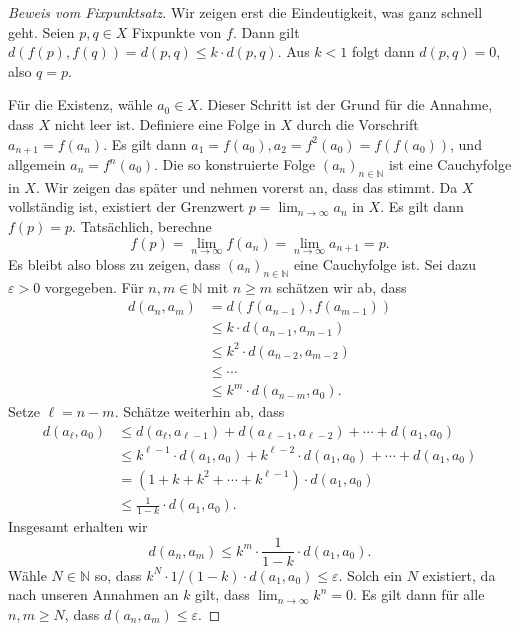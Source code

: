 \documentclass[../main.tex]{subfiles}
\begin{document}
\begin{proof}[Beweis vom Fixpunktsatz]
  Wir zeigen erst die Eindeutigkeit,
  was ganz schnell geht.
  Seien $p, q \in X$ Fixpunkte von $f$.
  Dann gilt $d(f(p), f(q)) = d(p,q) \leq k \cdot d(p, q)$.
  Aus $k < 1$ folgt dann $d(p, q) = 0$,
  also $q = p$.

  Für die Existenz, wähle $a_0 \in X$. Dieser
  Schritt ist der Grund für die Annahme,
  dass $X$ nicht leer ist.
  Definiere eine Folge in $X$ durch die
  Vorschrift $a_{n+1}= f(a_n)$.
  Es gilt dann $a_1 = f(a_0), a_2 = f^2(a_0) = f(f(a_0))$,
  und allgemein $a_n = f^n(a_0)$.
  Die so konstruierte Folge ${(a_{n})}_{n \in \mathbb{N}}$ 
  ist eine Cauchyfolge in $X$. Wir zeigen das später
  und nehmen vorerst an, dass das stimmt.
  Da $X$ vollständig ist, existiert der Grenzwert
  $p = \lim_{n \to \infty} a_n$ in $X$.
  Es gilt dann $f(p) = p$.
  Tatsächlich, berechne
  \[
  f(p) = \lim_{n \to \infty} f(a_n) = \lim_{n \to \infty}a_{n+1} = p.
  \]
  Es bleibt also bloss zu zeigen,
  dass $ {(a_n)}_{n \in \mathbb{N}}$
  eine Cauchyfolge ist.
  Sei dazu $\varepsilon > 0$ vorgegeben.
  Für $n, m \in \mathbb{N}$ mit $n \geq m$ 
  schätzen wir ab, dass
  \begin{align*}
    d(a_n, a_m)
    & = d(f(a_{n-1}), f(a_{m-1}))\\
    & \leq k \cdot d(a_{n-1}, a_{m-1}) \\
    &\leq k^2 \cdot d(a_{n-2}, a_{m-2})\\
    &\leq \cdots \\
    &\leq k^m \cdot d(a_{n-m}, a_0).
  \end{align*}
  Setze $\ell = n -m $.
  Schätze weiterhin ab, dass
  \begin{align*}
    d(a_{\ell}, a_0) 
    &\leq d(a_\ell, a_{\ell - 1})
    + d(a_{\ell - 1}, a_{\ell-2}) + \cdots + d(a_1, a_0)\\
    &\leq k^{\ell-1} \cdot d(a_{1}, a_{0})
    + k^{\ell - 2} \cdot d(a_1, a_0)
    + \cdots
    + d(a_1, a_0) \\
    &= (1 + k + k^2 + \cdots + k^{\ell-1})
    \cdot d(a_1, a_0) \\
    &\leq \frac{1}{1-k} \cdot d(a_1, a_0).
  \end{align*}
  Insgesamt erhalten wir
  \[
    d(a_n, a_m) \leq k^m \cdot \frac{1}{1-k} \cdot d(a_1, a_0).
  \]
  Wähle $N \in \mathbb{N}$ so,
  dass $k^N \cdot 1/(1-k) \cdot d(a_1, a_0) \leq \varepsilon$.
  Solch ein $N$ existiert, da 
  nach unseren Annahmen an $k$ gilt,
  dass $\lim_{n \to \infty} k^n = 0$.
  Es gilt dann für alle $n, m \geq N$, dass
  $d(a_n, a_m) \leq \varepsilon$.
\end{proof}
\end{document}
